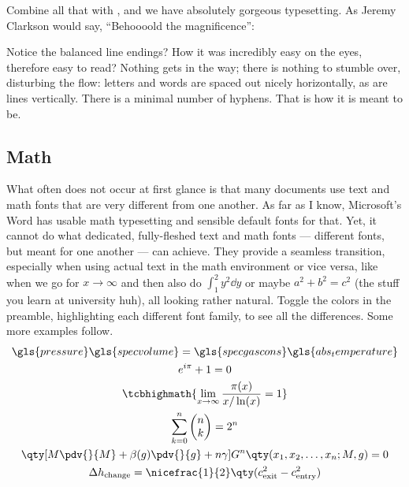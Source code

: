 Combine all that with , and we have absolutely gorgeous typesetting.
As Jeremy Clarkson would say, \enquote{Behoooold the magnificence}:

\vspace{1\baselineskip}
\parbox{0.9\linewidth}{%
\textcolor{g1}{\blindtext}
}
\vspace{1\baselineskip}

\noindent Notice the balanced line endings?
How it was incredibly easy on the eyes, therefore easy to read?
Nothing gets in the way; there is nothing to stumble over, disturbing the flow: letters and words are spaced out nicely horizontally, as are lines vertically.
There is a minimal number of hyphens.
That is how it is meant to be.

\subsection{Math}
What often does not occur at first glance is that many documents use text and math fonts that are very different from one another.
As far as I know, Microsoft's Word has usable math typesetting and sensible default fonts for that.
Yet, it cannot do what dedicated, fully-fleshed text and math fonts --- different fonts, but meant for one another --- can achieve.
They provide a seamless transition, especially when using actual text in the math environment or vice versa, like when we go for \(x \to \infty\) and then also do \(\int_{1}^{2} y^2 \dd{y}\) or maybe \(a^2 + b^2 = c^2\) (the stuff you learn at university huh), all looking rather natural.
Toggle the colors in the preamble, highlighting each different font family, to see all the differences.
Some more examples follow.
\begin{gather}
	\gls{pressure}\gls{specvolume} = \gls{specgascons}\gls{abs_temperature}\label{eq:click_me}\\
	e^{i\pi} + 1 = 0\\
	\tcbhighmath{\lim\limits_{x \to \infty} \frac{\pi(x)}{x / \ln(x)} = 1}\label{eq:highlighted}\\
	\sum_{k = 0}^{n} %
	\begin{pmatrix}%
		n \\ k
	\end{pmatrix}%
	= 2^{n}\\
	\qty[M \pdv{}{M} + \beta(g) \pdv{}{g} + n\gamma] G^{n} \qty(x_{1}, x_{2}, \dots, x_{n}; M, g) = 0\\
	\Delta h_{\text{change}} = \nicefrac{1}{2}\qty(c^2_{\text{exit}} - c^2_{\text{entry}})
\end{gather}

